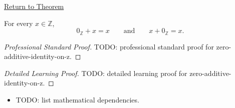 \newpage
{}
\label{prf:zero-additive-identity-on-z}

\begin{remark*}[Return]
\hyperref[thm:zero-additive-identity-on-z]{Return to Theorem}
\end{remark*}

\begin{theorem*}
For every $x\in\mathbb{Z}$,
\[
0_{\mathbb{Z}}+x=x
\qquad\text{and}\qquad
x+0_{\mathbb{Z}}=x.
\]
\end{theorem*}

\begin{proof}[Professional Standard Proof]
\LRAProofBodyStart
TODO: professional standard proof for zero-additive-identity-on-z.
\end{proof}

\begin{proof}[Detailed Learning Proof]
\LRAProofBodyStart
TODO: detailed learning proof for zero-additive-identity-on-z.
\end{proof}

\begin{remark*}
\end{remark*}

\begin{dependencies}
\begin{itemize}
  \item TODO: list mathematical dependencies.
\end{itemize}
\end{dependencies}

\clearpage
